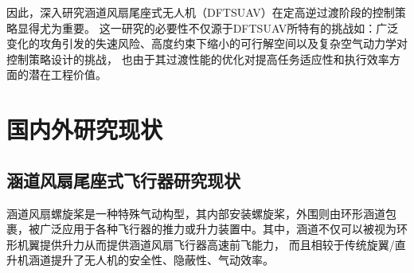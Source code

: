 因此，深入研究涵道风扇尾座式无人机（DFTSUAV）在定高逆过渡阶段的控制策略显得尤为重要。
这一研究的必要性不仅源于DFTSUAV所特有的挑战如：广泛变化的攻角引发的失速风险、高度约束下缩小的可行解空间以及复杂空气动力学对控制策略设计的挑战，
也由于其过渡性能的优化对提高任务适应性和执行效率方面的潜在工程价值。
\section{国内外研究现状}
\subsection{涵道风扇尾座式飞行器研究现状}
涵道风扇螺旋桨是一种特殊气动构型，其内部安装螺旋桨，外围则由环形涵道包裹，被广泛应用于各种飞行器的推力或升力装置中。其中，涵道不仅可以被视为环形机翼提供升力从而提供涵道风扇飞行器高速前飞能力，
而且相较于传统旋翼/直升机涵道提升了无人机的安全性、隐蔽性、气动效率。

